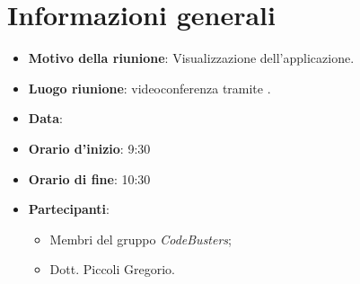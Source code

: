 \section{Informazioni generali}
\begin{itemize}
\item \textbf{Motivo della riunione}: Visualizzazione dell'applicazione.
\item \textbf{Luogo riunione}: videoconferenza tramite .
\item \textbf{Data}: \Data{}
\item \textbf{Orario d'inizio}: 9:30 
\item \textbf{Orario di fine}: 10:30 
\item \textbf{Partecipanti}:
	\begin{itemize}
	\item Membri del gruppo \textit{CodeBusters};
	\item Dott. Piccoli Gregorio.
	\end{itemize}
\end{itemize}

